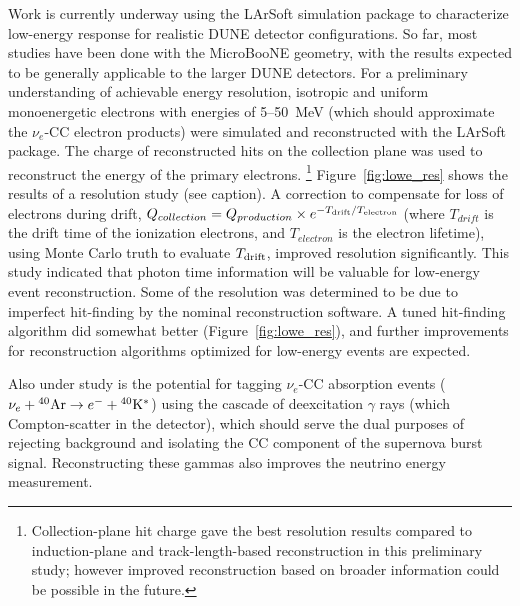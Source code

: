 Work is currently underway using the LArSoft simulation package
to characterize low-energy
response for realistic DUNE detector configurations.
So far,
most studies have been done with the MicroBooNE geometry, with the
results expected to be %
generally applicable to the larger DUNE detectors.  For a preliminary
understanding of achievable energy resolution, isotropic and uniform
monoenergetic electrons with energies of 5--50~MeV (which should
approximate the $\nu_e$-CC electron products) were simulated and
reconstructed with the LArSoft
package. 
The charge of reconstructed hits on the collection plane was used to
reconstruct the energy of the primary electrons.
\footnote{Collection-plane hit charge gave the best resolution results compared to
induction-plane and track-length-based reconstruction in this preliminary study; however improved reconstruction based on broader information could be possible in the future.}
Figure~\ref{fig:lowe_res} shows the results of a resolution study (see caption).
A correction to compensate for loss of electrons during drift,
$Q_{collection}=Q_{production}\times e^{-T_{\rm drift} / T_{\rm
    electron}}$ (where $T_{drift}$ is the drift time of the ionization
electrons, and $T_{electron}$ is the electron lifetime), using Monte
Carlo truth to evaluate $T_{\rm drift}$, improved resolution
significantly.  This study indicated that photon time information will
be valuable for low-energy event reconstruction.  Some of the
resolution was determined to be due to imperfect hit-finding by the
nominal reconstruction software.  A tuned hit-finding algorithm did
somewhat better (Figure~\ref{fig:lowe_res}), and further
improvements for reconstruction algorithms optimized for low-energy
events are expected.

Also under study is the potential for tagging $\nu_e$-CC absorption
events ($\nu_e +{}^{40}{\rm Ar} \rightarrow e^- +{}^{40}{\rm
  K^*}$) using the cascade of deexcitation $\gamma$ rays (which Compton-scatter in the detector), which should
serve the dual purposes of rejecting background and isolating the CC
component of the supernova burst signal.  Reconstructing these gammas also improves the neutrino energy measurement. 



